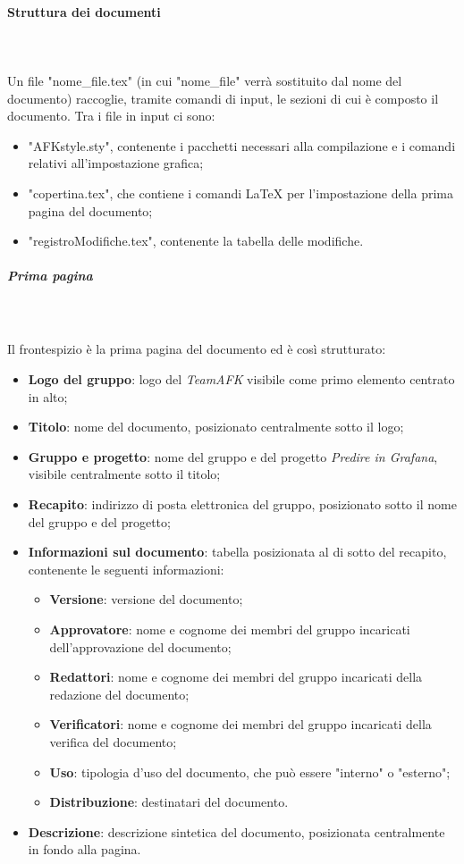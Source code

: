 \paragraph{Struttura dei documenti}\mbox{} \\ \mbox{} \\
Un file "nome\_file.tex" (in cui "nome\_file" verrà sostituito dal nome del documento) raccoglie, tramite comandi di input, le sezioni di cui è composto il documento. Tra i file in input ci sono:
\begin{itemize}
\item "AFKstyle.sty", contenente i pacchetti necessari alla compilazione e i comandi relativi all'impostazione grafica;
\item "copertina.tex", che contiene i comandi \LaTeX{} per l'impostazione della prima pagina del documento;
\item "registroModifiche.tex", contenente la tabella delle modifiche.
\end{itemize}

\subparagraph{Prima pagina}\mbox{} \\ \mbox{} \\
Il frontespizio è la prima pagina del documento ed è così strutturato:\begin{itemize}
\item \textbf{Logo del gruppo}: logo del \textit{TeamAFK} visibile come primo elemento centrato in alto;
\item \textbf{Titolo}: nome del documento, posizionato centralmente sotto il logo;
\item \textbf{Gruppo e progetto}: nome del gruppo e del progetto \textit{Predire in Grafana}, visibile centralmente sotto il titolo;
\item \textbf{Recapito}: indirizzo di posta elettronica del gruppo, posizionato sotto il nome del gruppo e del progetto;
\item \textbf{Informazioni sul documento}: tabella posizionata al di sotto del recapito, contenente le seguenti informazioni: \begin{itemize}
\item \textbf{Versione}: versione del documento;
\item \textbf{Approvatore}: nome e cognome dei membri del gruppo incaricati dell'approvazione del documento;
\item \textbf{Redattori}: nome e cognome dei membri del gruppo incaricati della redazione del documento;
\item \textbf{Verificatori}: nome e cognome dei membri del gruppo incaricati della verifica del documento;
\item \textbf{Uso}: tipologia d'uso del documento, che può essere "interno" o "esterno";
\item \textbf{Distribuzione}: destinatari del documento.
\end{itemize}
\item \textbf{Descrizione}: descrizione sintetica del documento, posizionata centralmente in fondo alla pagina.
\end{itemize}

